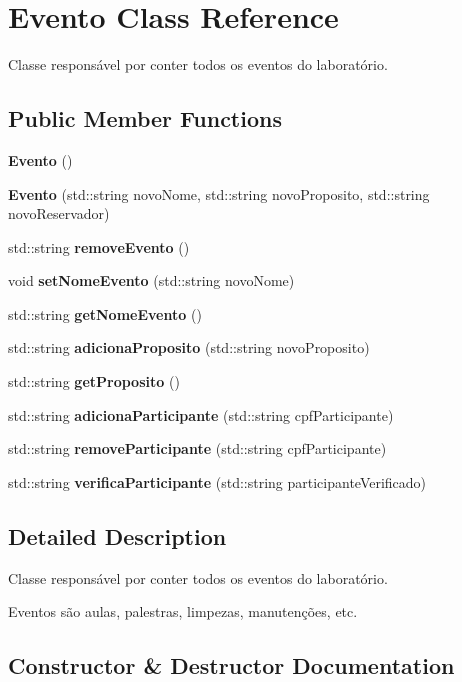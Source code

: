 \section{Evento Class Reference}
\label{class_evento}


Classe responsável por conter todos os eventos do laboratório.  


\subsection*{Public Member Functions}
\begin{DoxyCompactItemize}
\item 
\textbf{ Evento} ()
\item 
\textbf{ Evento} (std\+::string novo\+Nome, std\+::string novo\+Proposito, std\+::string novo\+Reservador)
\item 
std\+::string \textbf{ remove\+Evento} ()
\item 
void \textbf{ set\+Nome\+Evento} (std\+::string novo\+Nome)
\item 
std\+::string \textbf{ get\+Nome\+Evento} ()
\item 
std\+::string \textbf{ adiciona\+Proposito} (std\+::string novo\+Proposito)
\item 
std\+::string \textbf{ get\+Proposito} ()
\item 
std\+::string \textbf{ adiciona\+Participante} (std\+::string cpf\+Participante)
\item 
std\+::string \textbf{ remove\+Participante} (std\+::string cpf\+Participante)
\item 
std\+::string \textbf{ verifica\+Participante} (std\+::string participante\+Verificado)
\end{DoxyCompactItemize}


\subsection{Detailed Description}
Classe responsável por conter todos os eventos do laboratório. 

Eventos são aulas, palestras, limpezas, manutenções, etc. 

\subsection{Constructor \& Destructor Documentation}
\mbox{\label{class_evento_a7aba3bd7a832c5365ea0ccb318511452}} 
